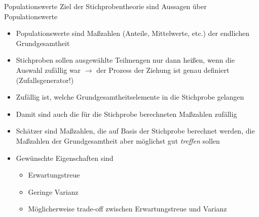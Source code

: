 \documentclass[9pt]{beamer}
\begin{document}
\begin{frame}{Populationswerte}
Ziel der Stichprobentheorie sind Aussagen \"{u}ber Populationswerte
\begin{itemize}
\item Populationswerte sind Ma{\ss}zahlen (Anteile, Mittelwerte, etc.) der endlichen Grundgesamtheit
\item Stichproben sollen ausgew\"{a}hlte Teilmengen nur dann hei{\ss}en, wenn die Auswahl zuf\"{a}llig war $\rightarrow$ der Prozess der Ziehung ist genau definiert (Zufallsgenerator!)
\item Zuf\"{a}llig ist, welche Grundgesamtheitselemente in die Stichprobe gelangen
\item Damit sind auch die f\"{u}r die Stichprobe berechneten Ma{\ss}zahlen zuf\"{a}llig
\item Sch\"{a}tzer sind Ma{\ss}zahlen, die auf Basis der Stichprobe berechnet werden, die Ma{\ss}zahlen der Grundgesamtheit aber m\"{o}glichst gut \emph{treffen} sollen
\item Gew\"{u}nschte Eigenschaften sind
    \begin{itemize}
    \item Erwartungstreue
    \item Geringe Varianz
    \item M\"{o}glicherweise trade-off zwischen Erwartungstreue und Varianz
    \end{itemize}
\end{itemize}
\end{frame}
\end{document}
